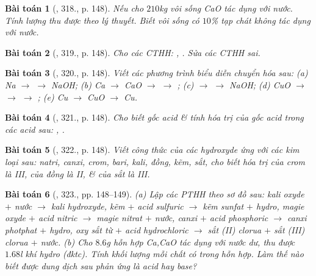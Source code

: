 \documentclass{article}
\newtheorem{baitoan}{Bài toán}
\begin{document}
\begin{baitoan}[\cite{An_400_BT_Hoa_Hoc_8_2020}, 318., p. 148]
	Nếu cho $210$\emph{kg} vôi sống \emph{CaO} tác dụng với nước. Tính lượng \emph{} thu được theo lý thuyết. Biết vôi sống có $10$\% tạp chát không tác dụng với nước.
\end{baitoan}

\begin{baitoan}[\cite{An_400_BT_Hoa_Hoc_8_2020}, 319., p. 148]
	Cho các CTHH: \emph{, }. Sửa các CTHH sai.
\end{baitoan}

\begin{baitoan}[\cite{An_400_BT_Hoa_Hoc_8_2020}, 320., p. 148]
	Viết các phương trình biểu diễn chuyển hóa sau: (a) \emph{Na $\to$  $\to$ NaOH}; (b) \emph{Ca $\to$ CaO $\to$  $\to$ }; (c) \emph{ $\to$  $\to$ NaOH}; (d) \emph{CuO $\to$  $\to$  $\to$ }; (e) \emph{Cu $\to$ CuO $\to$ Cu}.
\end{baitoan}

\begin{baitoan}[\cite{An_400_BT_Hoa_Hoc_8_2020}, 321., p. 148]
	Cho biết gốc acid \& tính hóa trị của gốc acid trong các acid sau: \emph{, }.
\end{baitoan}

\begin{baitoan}[\cite{An_400_BT_Hoa_Hoc_8_2020}, 322., p. 148]
	Viết công thức của các hydroxyde ứng với các kim loại sau: natri, canxi, crom, bari, kali, đồng, kẽm, sắt, cho biết hóa trị của crom là III, của đồng là II, \& của sắt là III.
\end{baitoan}

\begin{baitoan}[\cite{An_400_BT_Hoa_Hoc_8_2020}, 323., pp. 148--149]
	(a) Lập các PTHH theo sơ đồ sau: kali oxyde $+$ nước $\to$ kali hydroxyde, kẽm $+$ acid sulfuric $\to$ kẽm sunfat $+$ hydro, magie oxyde $+$ acid nitric $\to$ magie nitrat $+$ nước, canxi $+$ acid phosphoric $\to$ canxi photphat $+$ hydro, oxy sắt từ \emph{} $+$ acid hydrochloric $\to$ sắt (II) clorua $+$ sắt (III) clorua $+$ nước. (b) Cho $8.6$\emph{g} hỗn hợp \emph{Ca,CaO} tác dụng với nước dư, thu được $1.68$\emph{l} khí hydro (đktc). Tính khối lượng mỗi chất có trong hỗn hợp. Làm thế nào biết được dung dịch sau phản ứng là acid hay base?
\end{baitoan}
\end{document}

